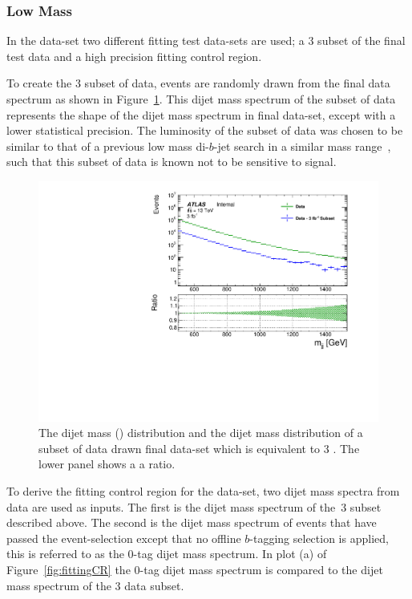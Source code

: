\subsubsection{Low Mass}
\label{sec:lowmass_bkgsample}

In the \lm{} data-set two different fitting test data-sets are used;
a 3 \ifb{} subset of the final test data and a high precision fitting control region.

To create the 3 \ifb{} subset of data,
events are randomly drawn from the final data spectrum as shown in Figure~\ref{fig:fittingDataSubset}.
This dijet mass spectrum of the subset of data represents the shape of the dijet mass spectrum in final data-set,
except with a lower statistical precision.
The luminosity of the subset of data was chosen to be similar to that of a
previous low mass di-$b$-jet search in a similar mass range~\cite{dibjet-lhcp_conf},
such that this subset of data is known not to be sensitive to signal.

\begin{figure}[!htb]
\captionsetup[subfigure]{aboveskip=0pt,justification=centering}
\centering
\includegraphics[width=0.7\linewidth, angle=0]{figs/Dibjet/LowMass/FitStudy/subset_dataComp.pdf}
\vspace{10pt}
\caption{\label{fig:fittingDataSubset}
  The \lm{} dijet mass (\mjj{}) distribution and the dijet mass distribution of a subset of data drawn final data-set which is equivalent to 3 \ifb{}.
  The lower panel shows a a ratio.}
\end{figure}

To derive the fitting control region for the \lm{} data-set,
two dijet mass spectra from data are used as inputs.
The first is the dijet mass spectrum of the~3 \ifb{} subset described above.
The second is the dijet mass spectrum of events that have passed the \lm{} event-selection
except that no offline $b$-tagging selection is applied, this is referred to as the 0-tag dijet mass spectrum.
In plot (a) of Figure~\ref{fig:fittingCR} the 0-tag dijet mass spectrum is compared to the dijet mass spectrum of the 3 \ifb{} data subset.

